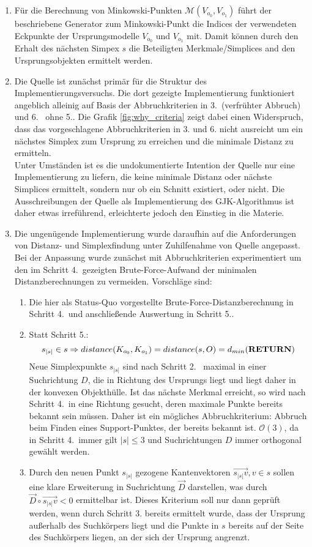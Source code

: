 \begin{enumerate}
\item Für die Berechnung von Minkowski-Punkten $\mathcal{M}(V_{o_0}, V_{o_1})$ führt der beschriebene Generator zum Minkowski-Punkt die Indices der verwendeten Eckpunkte der Ursprungsmodelle $V_{o_0}$ und $V_{o_1}$ mit. Damit können durch den Erhalt des nächsten Simpex $s$ die Beteiligten Merkmale/Simplices and den Ursprungsobjekten ermittelt werden.
\item Die Quelle \cite{gjk-casey} ist zunächst primär für die Struktur des Implementierungsversuchs. Die dort gezeigte Implementierung funktioniert angeblich alleinig auf Basis der Abbruchkriterien in 3.~(verfrühter Abbruch) und 6.~ ohne 5..
Die Grafik \ref{fig:why_criteria} zeigt dabei einen Widerspruch, dass das vorgeschlagene Abbruchkriterien in 3. und 6. nicht ausreicht um ein nächstes Simplex zum Ursprung zu erreichen und die minimale Distanz zu ermitteln.\\
Unter Umständen ist es die undokumentierte Intention der Quelle \cite{gjk-casey} nur eine Implementierung zu liefern, die keine minimale Distanz oder nächste Simplices ermittelt, sondern nur ob ein Schnitt existiert, oder nicht. Die Ausschreibungen der Quelle als Implementierung des GJK-Algorithmus ist daher etwas irreführend, erleichterte jedoch den Einstieg in die Materie.
\item Die ungenügende Implementierung wurde daraufhin auf die Anforderungen von Distanz- und Simplexfindung unter Zuhilfenahme von Quelle \cite{gjk} angepasst.
Bei der Anpassung wurde zunächst mit Abbruchkriterien experimentiert um den im Schritt 4.~gezeigten Brute-Force-Aufwand der minimalen Distanzberechnungen zu vermeiden. Vorschläge sind:
\begin{enumerate}
	\item Die hier als Status-Quo vorgestellte Brute-Force-Distanzberechnung in Schritt 4.~und anschließende Auswertung in Schritt 5..
	\item Statt Schritt 5.:
	 $$s_{|s|} \in s \Rightarrow distance(K_{o_0}, K_{o_1}) = distance(s, O) = d_{min}\text{(\textbf{RETURN})}$$ 
	 Neue Simplexpunkte $s_{|s|}$ sind nach Schritt 2.~ maximal in einer Suchrichtung $D$, die in Richtung des Ursprungs liegt und liegt daher in der konvexen Objekthülle. Ist das nächste Merkmal erreicht, so wird nach Schritt 4.~in eine Richtung gesucht, deren maximale Punkte bereits bekannt sein müssen. Daher ist ein mögliches Abbruchkriterium: Abbruch beim Finden eines Support-Punktes, der bereits bekannt ist. $\mathcal{O}(3)$, da in Schritt 4.~immer gilt $|s|\leq 3$ und Suchrichtungen $D$ immer orthogonal gewählt werden.
	\item Durch den neuen Punkt $s_{|s|}$ gezogene Kantenvektoren $\vec{s_{|s|}v}, v\in s$ sollen eine klare Erweiterung in Suchrichtung $\vec{D}$ darstellen, was durch $\vec{D} \circ \vec{s_{|s|}v} < 0$ ermittelbar ist. Dieses Kriterium soll nur dann geprüft werden, wenn durch Schritt 3. bereits ermittelt wurde, dass der Ursprung außerhalb des Suchkörpers liegt und die Punkte in $s$ bereits auf der Seite des Suchkörpers liegen, an der sich der Ursprung angrenzt.
\end{enumerate}


\end{enumerate}
